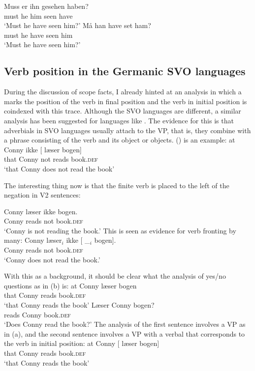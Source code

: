 \eal
\ex 
\gll Muss er ihn gesehen haben?\\
     must he him seen have\\\german
\glt `Must he have seen him?'
\ex 
\gll Må han have set ham?\\
     must he have seen him\\\danish
\glt `Must he have seen him?'
\zl
{}



\subsection{Verb position in the Germanic SVO languages}
\label{sec-danish-verb-movement}\label{sec-Germanic-SVO-verb-position}

During the discussion of scope facts, I already hinted at an analysis in which a  marks the
position of the verb in final position and the verb in initial position is coindexed with this
trace. Although the SVO languages are different, a similar analysis has been suggested for languages
like . The evidence for this is that adverbials in SVO languages usually attach to the VP,
that is, they combine with a phrase consisting of the verb and its object or objects. () is
an example:
\ea
\gll  at   Conny ikke [ læser bogen]\\
      that Conny not      {}        reads          book.\textsc{def}\\\danish
\glt `that Conny does not read the book'
\z

The interesting thing now is that the finite verb is placed to the left of the negation in V2 sentences:

\ea
\gll  Conny læser ikke bogen.\\
       Conny reads   not  book.\textsc{def}\\\danish
\glt `Conny is not reading the book.'
\z
This is seen as evidence for verb fronting by many:
\ea
\gll  Conny læser$_i$ ikke [ \_$_i$ bogen].\\
      Conny reads      not  {} {}    book.\textsc{def}\\\danish
\glt `Conny does not read the book.'
\z
\nocite{KS2002a}

With this as a background, it should be clear what the analysis of yes/no questions as in (b) is:
\eal
\ex
\gll at Conny læser bogen\\
     that Conny reads book.\textsc{def}\\\danish
\glt `that Conny reads the book'
\ex\label{ex-laeser-jens-bogen}
\gll Læser Conny bogen?\\
     reads Conny book.\textsc{def}\\
\glt `Does Conny read the book?'
\zl
The analysis of the first sentence involves a VP as in (a), and the second sentence involves a
VP with a verbal  that corresponds to the verb in initial position:
\eal
\ex
\gll at Conny [ læser bogen]\\
     that Conny {} reads book.\textsc{def}\\\danish
\glt `that Conny reads the book'

